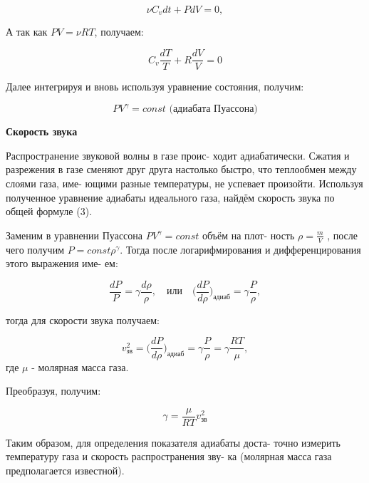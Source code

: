 \documentclass[12pt]{article}
\begin{document}
    \begin{equation}
        \nu C_v dt + P dV = 0,
    \end{equation}

    А так как $PV = \nu RT$, получаем: 

    \begin{equation}
        C_v \frac{dT}{T} + R \frac{dV}{V} = 0
    \end{equation}

    Далее интегрируя и вновь используя уравнение состояния, получим:

    \begin{equation}
        PV^{\gamma} = const
        \text{  (адиабата Пуассона)}
    \end{equation}

    \textbf{Скорость звука}

    Распространение звуковой волны в газе проис- ходит адиабатически. Сжатия и разрежения в газе сменяют друг друга настолько быстро, что теплообмен между слоями газа, име- ющими разные температуры, не успевает произойти. Используя полученное уравнение адиабаты идеального газа, найдём скорость звука по общей формуле (3).

    Заменим в уравнении Пуассона $PV^{\gamma} = const$ объём на плот- ность $\rho = \frac{m}{V}$ , после чего получим $P = const \rho^{\gamma} $. Тогда после логарифмирования и дифференцирования этого выражения име- ем:

    \begin{equation}
        \frac{dP}{P} = \gamma \frac {d\rho}{\rho}, \quad \text{или} \quad \bigg(\frac{dP}{d\rho}\bigg)_\text{адиаб} = \gamma \frac{P}{\rho},
    \end{equation}

    тогда для скорости звука получаем:

    \begin{equation}
        v_\text{зв}^2 = \bigg(\frac{dP}{d\rho}\bigg)_\text{адиаб} = \gamma \frac{P}{\rho} = \gamma \frac{RT}{\mu},
    \end{equation}
    где $\mu$ - молярная масса газа.

    Преобразуя, получим:

    \begin{equation}
        \gamma = \frac{\mu}{RT}v_\text{зв}^2
    \end{equation}

    Таким образом, для определения показателя адиабаты доста- точно измерить температуру газа и скорость распространения зву- ка (молярная масса газа предполагается известной).
\end{document}
